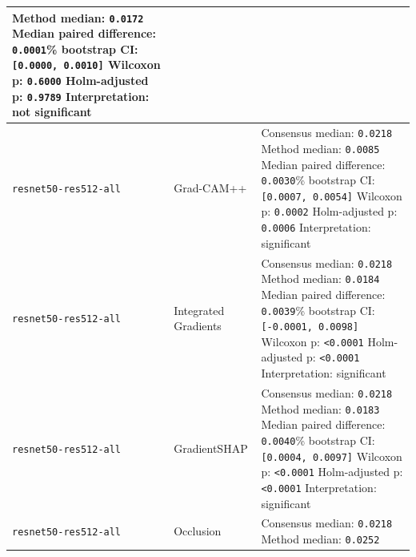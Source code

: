 \begin{longtable}[]{@{}
		>{\raggedright\arraybackslash}p{}
		>{\raggedright\arraybackslash}p{}
		>{\raggedright\arraybackslash}p{}
		@{}}
	Method median: \texttt{0.0172}\newline
	Median paired difference: \texttt{0.0001}\newline
	95\% bootstrap CI: \texttt{[0.0000, 0.0010]}\newline
	Wilcoxon p: \texttt{0.6000}\newline
	Holm-adjusted p: \texttt{0.9789}\newline
	Interpretation: not significant\tabularnewline
	\midrule
	\texttt{resnet50-\allowbreak res512-\allowbreak all} & Grad-CAM++ &
	Consensus median: \texttt{0.0218}\newline
	Method median: \texttt{0.0085}\newline
	Median paired difference: \texttt{0.0030}\newline
	95\% bootstrap CI: \texttt{[0.0007, 0.0054]}\newline
	Wilcoxon p: \texttt{0.0002}\newline
	Holm-adjusted p: \texttt{0.0006}\newline
	Interpretation: significant\tabularnewline
	\midrule
	\texttt{resnet50-\allowbreak res512-\allowbreak all} & Integrated Gradients &
	Consensus median: \texttt{0.0218}\newline
	Method median: \texttt{0.0184}\newline
	Median paired difference: \texttt{0.0039}\newline
	95\% bootstrap CI: \texttt{[-0.0001, 0.0098]}\newline
	Wilcoxon p: \texttt{\textless0.0001}\newline
	Holm-adjusted p: \texttt{\textless0.0001}\newline
	Interpretation: significant\tabularnewline
	\midrule
	\texttt{resnet50-\allowbreak res512-\allowbreak all} & GradientSHAP &
	Consensus median: \texttt{0.0218}\newline
	Method median: \texttt{0.0183}\newline
	Median paired difference: \texttt{0.0040}\newline
	95\% bootstrap CI: \texttt{[0.0004, 0.0097]}\newline
	Wilcoxon p: \texttt{\textless0.0001}\newline
	Holm-adjusted p: \texttt{\textless0.0001}\newline
	Interpretation: significant\tabularnewline
	\midrule
	\texttt{resnet50-\allowbreak res512-\allowbreak all} & Occlusion &
	Consensus median: \texttt{0.0218}\newline
	Method median: \texttt{0.0252}\newline

\end{longtable}
